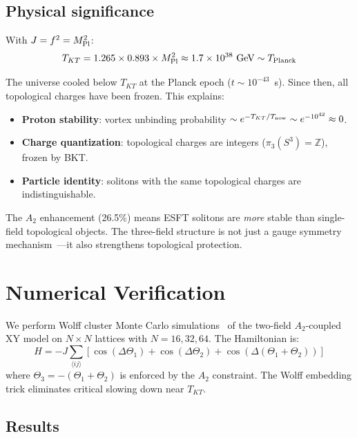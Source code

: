 ﻿\documentclass[twocolumn,showpacs,preprintnumbers,amsmath,amssymb,prd]{revtex4-2}
\begin{document}
\subsection{Physical significance}

With $J = f^2 = M_{\rm Pl}^2$:
\begin{equation}
T_{KT} = 1.265 \times 0.893 \times M_{\rm Pl}^2 \approx 1.7 \times 10^{38}~\text{GeV} \sim T_{\rm Planck}
\end{equation}

The universe cooled below $T_{KT}$ at the Planck epoch ($t \sim 10^{-43}$~s). Since then, all topological charges have been frozen. This explains:
\begin{itemize}
\item \textbf{Proton stability}: vortex unbinding probability $\sim e^{-T_{KT}/T_{\rm now}} \sim e^{-10^{42}} \approx 0$.
\item \textbf{Charge quantization}: topological charges are integers ($\pi_3(S^3) = \mathbb{Z}$), frozen by BKT.
\item \textbf{Particle identity}: solitons with the same topological charges are indistinguishable.
\end{itemize}

The $A_2$ enhancement (26.5\%) means ESFT solitons are \emph{more} stable than single-field topological objects. The three-field structure is not just a gauge symmetry mechanism~\cite{Paper2}---it also strengthens topological protection.

\section{Numerical Verification}
\label{sec:numerics}

We perform Wolff cluster Monte Carlo simulations~\cite{Wolff1989} of the two-field $A_2$-coupled XY model on $N \times N$ lattices with $N = 16, 32, 64$. The Hamiltonian is:
\begin{equation}
H = -J \sum_{\langle ij \rangle} [\cos(\Delta\Theta_1) + \cos(\Delta\Theta_2) + \cos(\Delta(\Theta_1 + \Theta_2))]
\end{equation}
where $\Theta_3 = -(\Theta_1 + \Theta_2)$ is enforced by the $A_2$ constraint. The Wolff embedding trick eliminates critical slowing down near $T_{KT}$.

\subsection{Results}
\end{document}
